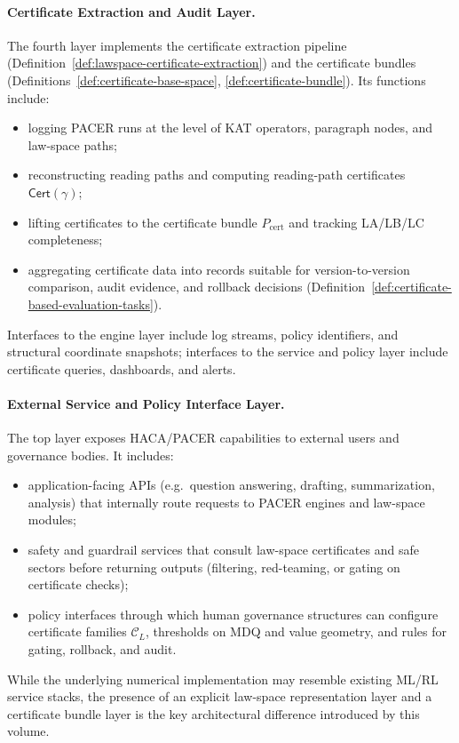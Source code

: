 \documentclass[11pt]{book}
\theoremstyle{plain}
\theoremstyle{definition}
\theoremstyle{remark}
\begin{document}
\paragraph{Certificate Extraction and Audit Layer.}
The fourth layer implements the certificate extraction pipeline
(Definition~\ref{def:lawspace-certificate-extraction}) and the
certificate bundles (Definitions~\ref{def:certificate-base-space},
\ref{def:certificate-bundle}). Its functions include:
\begin{itemize}
  \item logging PACER runs at the level of KAT operators, paragraph
        nodes, and law-space paths;
  \item reconstructing reading paths and computing reading-path
        certificates $\mathsf{Cert}(\gamma)$;
  \item lifting certificates to the certificate bundle
        $P_{\mathrm{cert}}$ and tracking LA/LB/LC completeness;
  \item aggregating certificate data into records suitable for
        version-to-version comparison, audit evidence, and rollback
        decisions (Definition~\ref{def:certificate-based-evaluation-tasks}).
\end{itemize}
Interfaces to the engine layer include log streams, policy identifiers,
and structural coordinate snapshots; interfaces to the service and
policy layer include certificate queries, dashboards, and alerts.

\paragraph{External Service and Policy Interface Layer.}
The top layer exposes HACA/PACER capabilities to external users and
governance bodies. It includes:
\begin{itemize}
  \item application-facing APIs (e.g.\ question answering, drafting,
        summarization, analysis) that internally route requests to
        PACER engines and law-space modules;
  \item safety and guardrail services that consult law-space
        certificates and safe sectors before returning outputs
        (filtering, red-teaming, or gating on certificate checks);
  \item policy interfaces through which human governance structures
        can configure certificate families $\mathcal{C}_L$, thresholds
        on MDQ and value geometry, and rules for gating, rollback, and
        audit.
\end{itemize}
While the underlying numerical implementation may resemble existing
ML/RL service stacks, the presence of an explicit law-space
representation layer and a certificate bundle layer is the key
architectural difference introduced by this volume.
\end{document}
